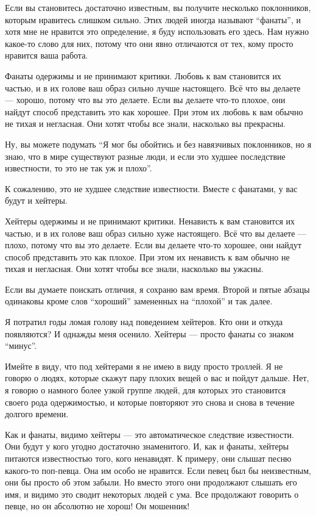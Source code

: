\documentclass[ebook,12pt,oneside,openany]{memoir}
\begin{document}
\maketitle

Если вы становитесь достаточно известным, вы получите несколько
поклонников, которым нравитесь слишком сильно. Этих людей иногда
называют “фанаты”, и хотя мне не нравится это определение, я буду
использовать его здесь. Нам нужно какое-то слово для них, потому что
они явно отличаются от тех, кому просто нравится ваша работа.


Фанаты одержимы и не принимают критики. Любовь к вам становится их
частью, и в их голове ваш образ сильно лучше настоящего. Всё что вы
делаете — хорошо, потому что вы это делаете. Если вы делаете что-то
плохое, они найдут способ представить это как хорошее. При этом их
любовь к вам обычно не тихая и негласная. Они хотят чтобы все знали,
насколько вы прекрасны.


Ну, вы можете подумать “Я мог бы обойтись и без навязчивых
поклонников, но я знаю, что в мире существуют разные люди, и если это
худшее последствие известности, то это не так уж и плохо”.


К сожалению, это не худшее следствие известности. Вместе с фанатами, у
вас будут и хейтеры.


Хейтеры одержимы и не принимают критики. Ненависть к вам становится их
частью, и в их голове ваш образ сильно хуже настоящего. Всё что вы
делаете — плохо, потому что вы это делаете. Если вы делаете что-то
хорошее, они найдут способ представить это как плохое. При этом их
ненависть к вам обычно не тихая и негласная. Они хотят чтобы все
знали, насколько вы ужасны.


Если вы думаете поискать отличия, я сохраню вам время. Второй и пятые
абзацы одинаковы кроме слов “хороший” замененных на “плохой” и так
далее.


Я потратил годы ломая голову над поведением хейтеров. Кто они и откуда
появляются? И однажды меня осенило. Хейтеры — просто фанаты со знаком
“минус”.


Имейте в виду, что под хейтерами я не имею в виду просто троллей. Я не
говорю о людях, которые скажут пару плохих вещей о вас и пойдут
дальше. Нет, я говорю о намного более узкой группе людей, для которых
это становится своего рода одержимостью, и которые повторяют это снова
и снова в течение долгого времени.


Как и фанаты, видимо хейтеры — это автоматическое следствие
известности. Они будут у кого угодно достаточно знаменитого. И, как и
фанаты, хейтеры питаются известностью того, кого ненавидят. К примеру,
они слышат песню какого-то поп-певца. Она им особо не нравится. Если
певец был бы неизвестным, они бы просто об этом забыли. Но вместо
этого они продолжают слышать его имя, и видимо это сводит некоторых
людей с ума. Все продолжают говорить о певце, но он абсолютно не
хорош! Он мошенник!
\end{document}
